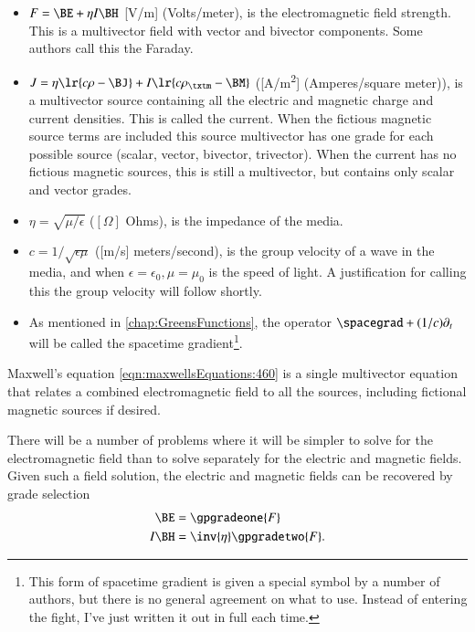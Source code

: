 \begin{itemize}
\item \( F = \BE + \eta I \BH \) [\si{V/m}] (Volts/meter), is the electromagnetic field strength.
This is a multivector field with vector and bivector components.  Some authors call this the Faraday.
\item \( J = \eta \lr{ c \rho - \BJ } + I \lr{ c \rho_\txtm - \BM } \) ([\si{A/m^2}] (Amperes/square meter)),
is a multivector source containing all the electric and magnetic charge and current densities.  This is called the current.
When the fictious magnetic source terms are included this source multivector has one grade for each possible source (scalar, vector, bivector, trivector).  When the current has no fictious magnetic sources, this is still a multivector, but contains only scalar and vector grades.
\item \( \eta = \sqrt{\mu/\epsilon} \) (\( [\Omega] \) Ohms), is the impedance of the media.
\item \( c = 1/\sqrt{\epsilon\mu} \) ([\si{m/s}] meters/second), is the group velocity of a wave in the media, and when \( \epsilon = \epsilon_0, \mu = \mu_0 \) is the speed of light.
A justification for calling this the group velocity will follow shortly.
\item As mentioned in \cref{chap:GreensFunctions}, the operator \( \spacegrad + (1/c) \partial_t \) will be called the spacetime gradient\footnote{
This form of spacetime gradient is given a special symbol by a number of authors, but there is no general agreement on what to use.
Instead of entering the fight, I've just written it out in full each time.}.
\end{itemize}

Maxwell's equation \cref{eqn:maxwellsEquations:460} is a
single multivector equation that relates a combined electromagnetic field to all the sources, including fictional magnetic sources if desired.

There will be a number of problems where it will be simpler to solve for the electromagnetic field than to solve separately for the electric and magnetic fields.
Given such a field solution, the electric and magnetic fields can be recovered by grade selection
\begin{dmath}\label{eqn:isotropicMaxwells:480}
\begin{aligned}
\BE &= \gpgradeone{F} \\
I \BH &= \inv{\eta} \gpgradetwo{F}.
\end{aligned}
\end{dmath}
